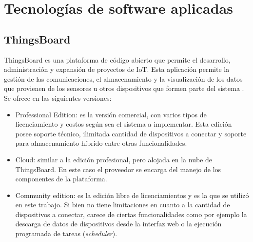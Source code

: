 \section{Tecnologías de software aplicadas}
\label{sec:Software aplicado}
\subsection{ThingsBoard}
\label{sec:ThingsBoard}
ThingsBoard es una plataforma de código abierto que permite el desarrollo, administración y expansión de proyectos de IoT. Esta aplicación permite la gestión de las comunicaciones, el almacenamiento y la visualización de los datos que provienen de los sensores u otros dispositivos que formen parte del sistema \citep{thingsboard:1}.
Se ofrece en las siguientes versiones:
\begin{itemize}

\item Professional Edition: es la versión comercial, con varios tipos de licenciamiento y costos según sea el sistema a implementar. Esta edición posee soporte técnico, ilimitada cantidad de dispositivos a conectar y soporte para almacenamiento híbrido entre otras funcionalidades.

\item Cloud: similar a la edición profesional, pero alojada en la nube de ThingsBoard. En este caso el proveedor se encarga del manejo de los componentes de la plataforma.
 
\item Community edition: es la edición libre de licenciamientos y es la que se utilizó en este trabajo. Si bien no tiene limitaciones en cuanto a la cantidad de dispositivos a conectar, carece de ciertas funcionalidades como por ejemplo la descarga de datos de dispositivos desde la interfaz web o la ejecución programada de tareas (\textit{scheduler}).
\end{itemize}
%
%
%
